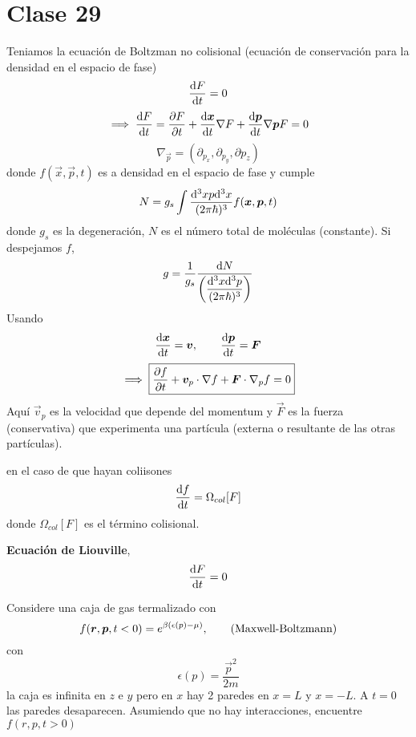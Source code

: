 \section{Clase 29}
Teniamos la ecuación de Boltzman no colisional (ecuación de conservación para la densidad en el espacio de fase)
\begin{equation}
  \dv{F}{t}=0
\end{equation}
\begin{equation}
  \implies \dv{F}{t}=\pdv{F}{t}+\dv{\vb*{x}}{t}\nabla F+\dv{\vb*{p}}{t}\nabla\vb*{p}F=0
\end{equation}
\begin{equation}
  \nabla_{\vec{p}}=(\partial_{p_x},\partial_{p_y},\partial{p_z})
\end{equation}
donde $f(\vec{x},\vec{p},t)$ es a densidad en el espacio de fase y cumple
\begin{equation}
  N=g_s\int\frac{\dd^3x p\dd^3 x}{(2\pi\hbar)^3}f(\vb*{x},\vb*{p},t)
\end{equation}
donde $g_s$ es la degeneración, $N$ es el número total de moléculas (constante). Si despejamos $f$,
\begin{equation}
  g=\frac{1}{g_s}\frac{\dd N}{\left(\dfrac{\dd^3x\dd ^3p}{(2\pi\hbar)^3}\right)}
\end{equation}
Usando
\begin{equation}
  \dv{\vb*{x}}{t}=\vb*{v},\qquad \dv{\vb*{p}}{t}=\vb*{F}
\end{equation}
\begin{equation}
  \implies\boxed{ \pdv{f}{t}+\vb*{v}_p\cdot\nabla f+\vb*{F}\cdot\nabla_p f=0}
\end{equation}
Aquí $\vec{v}_p$ es la velocidad que depende del momentum y $\vec{F}$ es la fuerza (conservativa) que experimenta una partícula (externa o resultante de las otras partículas).

en el caso de que hayan coliisones
\begin{equation}
  \dv{f}{t}=\Omega_{col}[F]
\end{equation}
donde $\Omega_{col}[F]$ es el término colisional.

\textbf{Ecuación de Liouville},
\begin{equation}
  \dv{F	}{t}=0
\end{equation}
\begin{ej}
	Considere una caja de gas termalizado con
	\begin{equation}
  f(\vb*{r},\vb*{p},t<0)=e^{\beta(\epsilon(p)-\mu )},\qquad \text{(Maxwell-Boltzmann)}
\end{equation}
con
\begin{equation}
  \epsilon(p)=\frac{\vec{p}^2}{2m}
\end{equation}
la caja es infinita en $z$ e $y$ pero en $x$ hay 2 paredes en $x=L$ y $x=-L$. A $t=0$ las paredes desaparecen. Asumiendo que no hay interacciones, encuentre $f(r,p,t>0)$

\end{ej}

